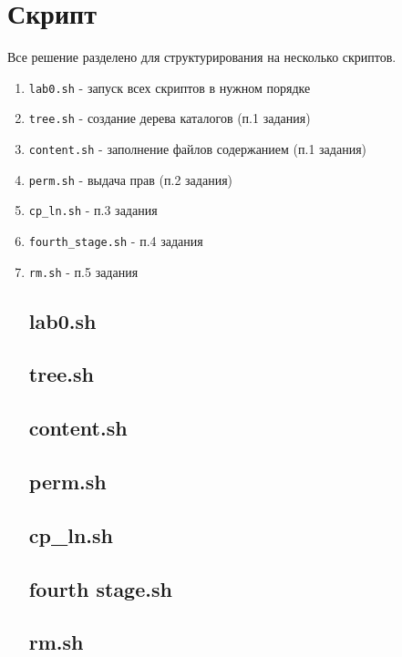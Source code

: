 \documentclass[11pt]{article}
\begin{document}
\section{Скрипт}
Все решение разделено для структурирования на несколько скриптов.
\begin{enumerate}
\item \texttt{lab0.sh} - запуск всех скриптов в нужном порядке
\item \texttt{tree.sh} - создание дерева каталогов (п.1 задания)
\item \texttt{content.sh} - заполнение файлов содержанием (п.1 задания)
\item \texttt{perm.sh} - выдача прав (п.2 задания)
\item \texttt{cp\_ln.sh} - п.3 задания
\item  \texttt{fourth\_stage.sh} - п.4 задания
\item  \texttt{rm.sh} - п.5 задания
\small
\subsection{lab0.sh}

\pagebreak{}
\subsection{tree.sh}

\subsection{content.sh}

\subsection{perm.sh}

\subsection{cp\_ln.sh}

\pagebreak{}
\subsection{fourth stage.sh}

\pagebreak{}
\subsection{rm.sh}


\end{enumerate}
\end{document}

